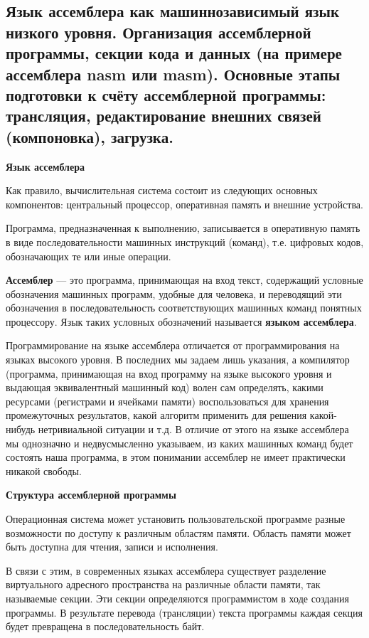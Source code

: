 \subsection{Язык  ассемблера  как  машиннозависимый  язык  низкого  уровня.  Организация  ассемблерной  программы, секции кода и данных (на примере ассемблера nasm или masm). Основные  этапы подготовки к счёту ассемблерной программы: трансляция, редактирование внешних связей (компоновка), загрузка.}

\textbf{Язык ассемблера}

Как правило, вычислительная система состоит из следующих основных компонентов: центральный процессор, оперативная память и внешние устройства. 

Программа, предназначенная к выполнению, записывается в оперативную память в виде последовательности машинных инструкций (команд), т.е. цифровых кодов, обозначающих те или иные операции.

\textbf{Ассемблер} --- это программа, принимающая на вход текст, содержащий условные обозначения машинных программ, удобные для человека, и переводящий эти обозначения в последовательность соответствующих машинных команд понятных процессору. 
Язык таких условных обозначений называется \textbf{языком ассемблера}.

Программирование на языке ассемблера отличается от программирования на языках высокого уровня. 
В последних мы задаем лишь указания, а компилятор (программа, принимающая на вход программу на языке высокого уровня и выдающая эквивалентный машинный код) волен сам определять, какими ресурсами (регистрами и ячейками памяти) воспользоваться для хранения промежуточных результатов, какой алгоритм применить для решения какой-нибудь нетривиальной ситуации и т.д. 
В отличие от этого на языке ассемблера мы однозначно и недвусмысленно указываем, из каких машинных команд будет состоять наша программа, в этом понимании ассемблер не имеет практически никакой свободы.

\textbf{Структура ассемблерной программы}

Операционная система может установить пользовательской программе разные возможности по доступу к различным областям памяти. Область памяти может быть доступна для чтения, записи и исполнения.

В связи с этим, в современных языках ассемблера существует разделение виртуального адресного пространства на различные области памяти, так называемые секции. 
Эти секции определяются программистом в ходе создания программы.
В результате перевода (трансляции) текста программы каждая секция будет превращена в последовательность байт. 

